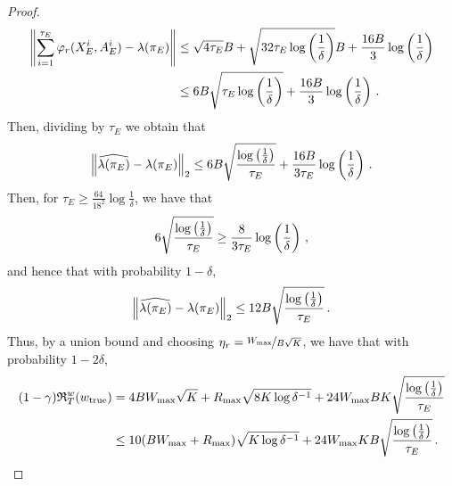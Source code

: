 \begin{proof}
    \begin{align*}
        \left\|\sum^{\tau_E}_{i=1} \varphi_r(X^i_E, A^i_E) - \lambda({\pi_E})\right\| &\leq \sqrt{4 \tau_E} B + \sqrt{32 \tau_E \log\left({\frac{1}{\delta}}\right)} B + \frac{16 B}{3}  \log\left({\frac{1}{\delta}}\right) \\
        &\leq 6 B \sqrt{\tau_E \log\left({\frac{1}{\delta}}\right)} + \frac{16 B}{3} \log \left({\frac{1}{\delta}}\right)\,.
    \end{align*}
    Then, dividing by $\tau_E$ we obtain that
    \begin{align*}
        \left\|\widehat{\lambda({\pi_E})} - \lambda({\pi_E})\right\|_{2} \leq 6 B \sqrt{\frac{\log\left({\frac{1}{\delta}}\right)}{\tau_E}} + \frac{16 B}{3 \tau_E} \log\left({\frac{1}{\delta}}\right)\,.
    \end{align*}
    Then, for $\tau_E \geq \frac{64}{18^2} \log \frac{1}{\delta}$, we have that
    \begin{equation*}
        6 \sqrt{\frac{\log\left({\frac{1}{\delta}}\right)}{\tau_E}} \geq \frac{8}{3 \tau_E} \log\left({\frac{1}{\delta}}\right)\,,
    \end{equation*}
    and hence that with probability $1 - \delta$,
    \begin{align*}
        \left\|\widehat{\lambda({\pi_E})} - \lambda({\pi_E})\right\|_{2} \leq 12 B \sqrt{\frac{\log\left({\frac{1}{\delta}}\right)}{\tau_E}}\,.
    \end{align*}
    Thus, by a union bound and choosing $\eta_r = \nicefrac{W_{\max}}{B \sqrt{K}}$, we have that with probability $1 - 2 \delta$,
    \begin{align*}
        (1-\gamma) \mathfrak{R}_T^w(w_{\mathrm{true}}) &= 4 B W_{\max} \sqrt{K} +  R_{\max}\sqrt{8 K \log \delta^{-1}} + 24 W_{\max} B K \sqrt{ \frac{\log\left({\frac{1}{\delta}}\right)}{\tau_E}} \\
        &\leq 10 (B W_{\max} + R_{\max}) \sqrt{K \log \delta^{-1}} + 24 W_{\max} K B \sqrt{\frac{\log \left({\frac{1}{\delta}}\right)}{\tau_E}}\,.
    \end{align*}
\end{proof}
